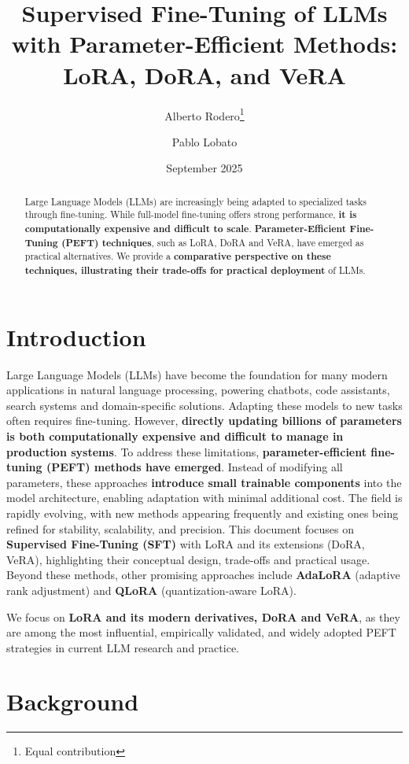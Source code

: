 \documentclass[11pt,a4paper]{article}
\title{Supervised Fine-Tuning of LLMs with Parameter-Efficient Methods: LoRA, DoRA, and VeRA}
\author{Alberto Rodero\thanks{Equal contribution} \and Pablo Lobato\footnotemark[1]}
\date{September 2025}
\begin{document}
\maketitle

\begin{abstract}
Large Language Models (LLMs) are increasingly being adapted to specialized tasks through fine-tuning. 
While full-model fine-tuning offers strong performance, \textbf{it is computationally expensive and difficult to scale}. 
\textbf{Parameter-Efficient Fine-Tuning (PEFT) techniques}, such as LoRA, DoRA and VeRA, have emerged as practical alternatives. 
We provide a \textbf{comparative perspective on these techniques, illustrating their trade-offs for practical deployment} of LLMs.
\end{abstract}

\section{Introduction}
Large Language Models (LLMs) have become the foundation for many modern applications in natural language processing, powering chatbots, code assistants, search systems and domain-specific solutions. 
Adapting these models to new tasks often requires fine-tuning. However, \textbf{directly updating billions of parameters is both computationally expensive and difficult to manage in production systems}.
To address these limitations, \textbf{parameter-efficient fine-tuning (PEFT) methods have emerged}. Instead of modifying all parameters, these approaches \textbf{introduce small trainable components} into the model architecture, enabling adaptation with minimal additional cost. The field is rapidly evolving, with new methods appearing frequently and existing ones being refined for stability, scalability, and precision. 
This document focuses on \textbf{Supervised Fine-Tuning (SFT)} with LoRA and its extensions (DoRA, VeRA), highlighting their conceptual design, trade-offs and practical usage. Beyond these methods, other promising approaches include \textbf{AdaLoRA}\cite{adaLora} (adaptive rank adjustment) and \textbf{QLoRA}\cite{qLora} (quantization-aware LoRA). 

We focus on \textbf{LoRA and its modern derivatives, DoRA and VeRA}, as they are among the most influential, empirically validated, and widely adopted PEFT strategies in current LLM research and practice.



\section{Background}
\end{document}
